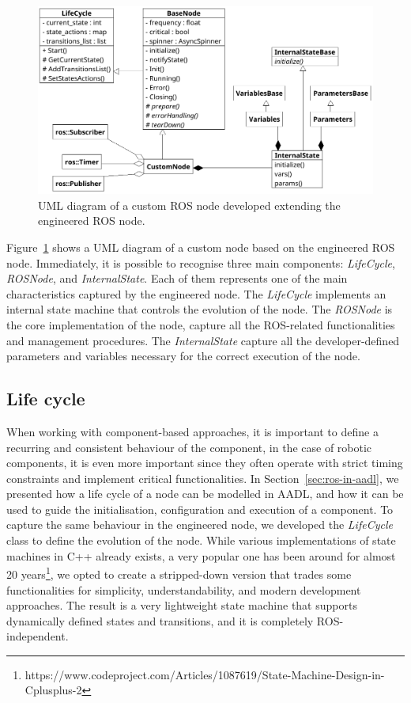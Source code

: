 \begin{figure}[t]
    \centering
    \includegraphics[width=\textwidth]{gfx/class}
    \caption{UML diagram of a custom ROS node developed extending the engineered ROS node.}\label{fig:node-class}
\end{figure}

Figure~\ref{fig:node-class} shows a UML diagram of a custom node based on the engineered ROS node. Immediately, it is possible to recognise three main components: \textit{LifeCycle}, \textit{ROSNode}, and \textit{InternalState}. Each of them represents one of the main characteristics captured by the engineered node. The \textit{LifeCycle} implements an internal state machine that controls the evolution of the node. The \textit{ROSNode} is the core implementation of the node, capture all the ROS-related functionalities and management procedures. The \textit{InternalState} capture all the developer-defined parameters and variables necessary for the correct execution of the node.

\subsection{Life cycle}
When working with component-based approaches, it is important to define a recurring and consistent behaviour of the component, in the case of robotic components, it is even more important since they often operate with strict timing constraints and implement critical functionalities. In Section~\ref{sec:ros-in-aadl}, we presented how a life cycle of a node can be modelled in AADL, and how it can be used to guide the initialisation, configuration and execution of a component. To capture the same behaviour in the engineered node, we developed the \textit{LifeCycle} class to define the evolution of the node. While various implementations of state machines in C++ already exists, a very popular one has been around for almost 20 years\footnote{https://www.codeproject.com/Articles/1087619/State-Machine-Design-in-Cplusplus-2}, we opted to create a stripped-down version that trades some functionalities for simplicity, understandability, and modern development approaches. The result is a very lightweight state machine that supports dynamically defined states and transitions, and it is completely ROS-independent.

